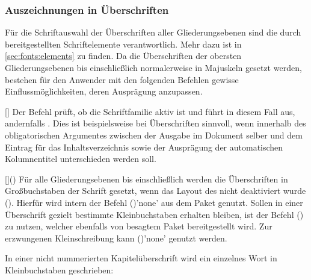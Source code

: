 \begin{Declaration*}{}
\begin{Declaration*}{}
\begin{Declaration*}{}
\subsubsection{Auszeichnungen in Überschriften}
%
%
Für die Schriftauswahl der Überschriften aller Gliederungsebenen sind die durch 
\KOMAScript{} bereitgestellten Schriftelemente verantwortlich. Mehr dazu ist in 
\autoref{sec:fonts:elements} zu finden. Da die Überschriften der obersten 
Gliederungsebenen bis einschließlich  normalerweise in 
Majuskeln gesetzt werden, bestehen für den Anwender mit den folgenden Befehlen 
gewisse Einflussmöglichkeiten, deren Ausprägung anzupassen.

\begin{Declaration}{[]}%
\printdeclarationlist%
%
%
%
%
Der Befehl  prüft, ob die Schriftfamilie \DIN aktiv ist und führt 
in diesem Fall  aus, andernfalls . 
Dies ist beispielsweise bei Überschriften sinnvoll, wenn innerhalb des 
obligatorischen Argumentes zwischen der Ausgabe im Dokument selber und dem 
Eintrag für das Inhaltsverzeichnis sowie der Ausprägung der automatischen 
Kolumnentitel unterschieden werden soll.
\end{Declaration}

\begin{Declaration}{[]()}%
\printdeclarationlist%
%
%
%
Für alle Gliederungsebenen bis einschließlich  werden die 
Überschriften in Großbuchstaben der Schrift \DIN gesetzt, wenn das Layout des 
\CDs nicht deaktiviert wurde (). Hierfür wird intern der 
Befehl ()'none' aus dem Paket 
 genutzt. Sollen in einer Überschrift gezielt bestimmte 
Kleinbuchstaben erhalten bleiben, ist der Befehl 
() zu nutzen, welcher ebenfalls von 
besagtem Paket bereitgestellt wird. Zur erzwungenen Kleinschreibung kann 
()'none' genutzt werden.
\end{Declaration}
%
\begin{Example}
In einer nicht nummerierten Kapitelüberschrift wird ein einzelnes Wort in 
Kleinbuchstaben geschrieben:
\begin{Code}[escapechar=§]
\end{Code}
\end{Example}


\end{Declaration*}
\end{Declaration*}
\end{Declaration*}
